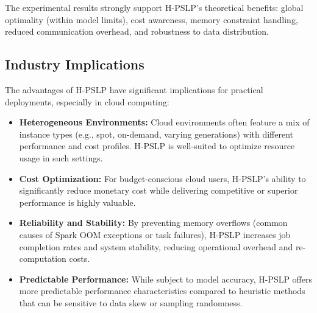 \documentclass[]{interact}
\theoremstyle{plain}
\theoremstyle{definition}
\theoremstyle{remark}
\begin{document}
The experimental results strongly support H-PSLP's theoretical benefits: global optimality (within model limits), cost awareness, memory constraint handling, reduced communication overhead, and robustness to data distribution.

\subsection{Industry Implications}

The advantages of H-PSLP have significant implications for practical deployments, especially in cloud computing:
\begin{itemize}
    \item \textbf{Heterogeneous Environments:} Cloud environments often feature a mix of instance types (e.g., spot, on-demand, varying generations) with different performance and cost profiles. H-PSLP is well-suited to optimize resource usage in such settings.
    \item \textbf{Cost Optimization:} For budget-conscious cloud users, H-PSLP's ability to significantly reduce monetary cost while delivering competitive or superior performance is highly valuable.
    \item \textbf{Reliability and Stability:} By preventing memory overflows (common causes of Spark OOM exceptions or task failures), H-PSLP increases job completion rates and system stability, reducing operational overhead and re-computation costs.
    \item \textbf{Predictable Performance:} While subject to model accuracy, H-PSLP offers more predictable performance characteristics compared to heuristic methods that can be sensitive to data skew or sampling randomness.
\end{itemize}
\end{document}

